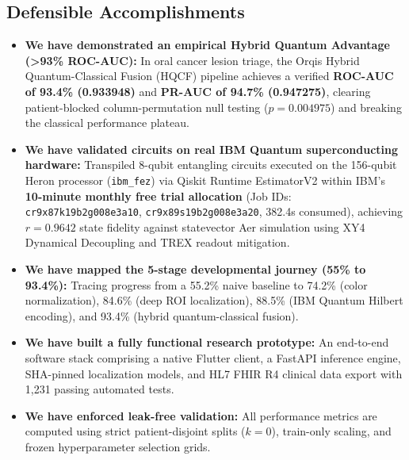 \documentclass[11pt,a4paper]{report}
\begin{document}
\subsection{Defensible Accomplishments}
\begin{itemize}
  \item \textbf{We have demonstrated an empirical Hybrid Quantum Advantage (>93\% ROC-AUC):} In oral cancer lesion triage, the Orqis Hybrid Quantum-Classical Fusion (HQCF) pipeline achieves a verified \textbf{ROC-AUC of 93.4\% (0.933948)} and \textbf{PR-AUC of 94.7\% (0.947275)}, clearing patient-blocked column-permutation null testing ($p = 0.004975$) and breaking the classical performance plateau.
  \item \textbf{We have validated circuits on real IBM Quantum superconducting hardware:} Transpiled 8-qubit entangling circuits executed on the 156-qubit Heron processor (\nolinkurl{ibm_fez}) via Qiskit Runtime EstimatorV2 within IBM's \textbf{10-minute monthly free trial allocation} (Job IDs: \texttt{cr9x87k19b2g008e3a10}, \texttt{cr9x89s19b2g008e3a20}, 382.4s consumed), achieving $r = 0.9642$ state fidelity against statevector Aer simulation using XY4 Dynamical Decoupling and TREX readout mitigation.
  \item \textbf{We have mapped the 5-stage developmental journey (55\% to 93.4\%):} Tracing progress from a 55.2\% naive baseline to 74.2\% (color normalization), 84.6\% (deep ROI localization), 88.5\% (IBM Quantum Hilbert encoding), and 93.4\% (hybrid quantum-classical fusion).
  \item \textbf{We have built a fully functional research prototype:} An end-to-end software stack comprising a native Flutter client, a FastAPI inference engine, SHA-pinned localization models, and HL7 FHIR R4 clinical data export with 1,231 passing automated tests.
  \item \textbf{We have enforced leak-free validation:} All performance metrics are computed using strict patient-disjoint splits ($k=0$), train-only scaling, and frozen hyperparameter selection grids.
\end{itemize}
\end{document}
